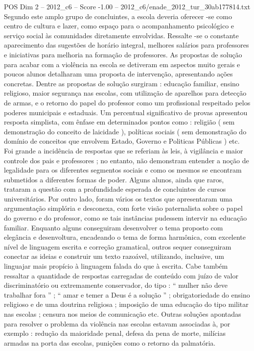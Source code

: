 \begin{textsample}{POS Dim 2 – 2012\_c6 – Score -1.00 – 2012\_c6/enade\_2012\_tur\_30ab177814.txt}
Segundo este amplo grupo de concluintes, a escola deveria oferecer -se como centro de cultura e lazer, como espaço para o acompanhamento psicológico e serviço social às comunidades diretamente envolvidas.
Ressalte -se o constante aparecimento das sugestões de horário integral, melhores salários para professores e iniciativas para melhoria na formação de professores.
As propostas de solução para acabar com a violência na escola se detiveram em aspectos muito gerais e poucos alunos detalharam uma proposta de intervenção, apresentando ações concretas.
Dentre as propostas de solução surgiram : educação familiar, ensino religioso, maior segurança nas escolas, com utilização de aparelhos para detecção de armas, e o retorno do papel do professor como um profissional respeitado pelos poderes municipais e estaduais.
Um percentual significativo de provas apresentou resposta simplista, com ênfase em determinados pontos como : religião ( sem demonstração do conceito de laicidade ), políticas sociais ( sem demonstração do domínio de conceitos que envolvem Estado, Governo e Politicas Públicas ) etc.
Foi grande a incidência de respostas que se referiam às leis, à vigilância e maior controle dos pais e professores ; no entanto, não demonstram entender a noção de legalidade para os diferentes segmentos sociais e como os mesmos se encontram submetidos a diferentes formas de poder.
Alguns alunos, ainda que raros, trataram a questão com a profundidade esperada de concluintes de cursos universitários.
Por outro lado, foram vários os textos que apresentaram uma argumentação simplória e desconexa, com forte visão paternalista sobre o papel do governo e do professor, como se tais instâncias pudessem intervir na educação familiar.
Enquanto alguns conseguiram desenvolver o tema proposto com elegância e desenvoltura, encadeando o tema de forma harmônica, com excelente nível de linguagem escrita e correção gramatical, outros sequer conseguiram conectar as ideias e construir um texto razoável, utilizando, inclusive, um linguajar mais propício à linguagem falada do que à escrita.
Cabe também ressaltar a quantidade de respostas carregadas de conteúdo com juízo de valor discriminatório ou extremamente conservador, do tipo : “ mulher não deve trabalhar fora ” ; “ amar e temer a Deus é a solução ” ; obrigatoriedade do ensino religioso e de uma doutrina religiosa ; imposição de uma educação do tipo militar nas escolas ; censura nos meios de comunicação etc.
Outras soluções apontadas para resolver o problema da violência nas escolas estavam associadas à, por exemplo : redução da maioridade penal, defesa da pena de morte, milícias armadas na porta das escolas, punições como o retorno da palmatória.

\end{textsample}
